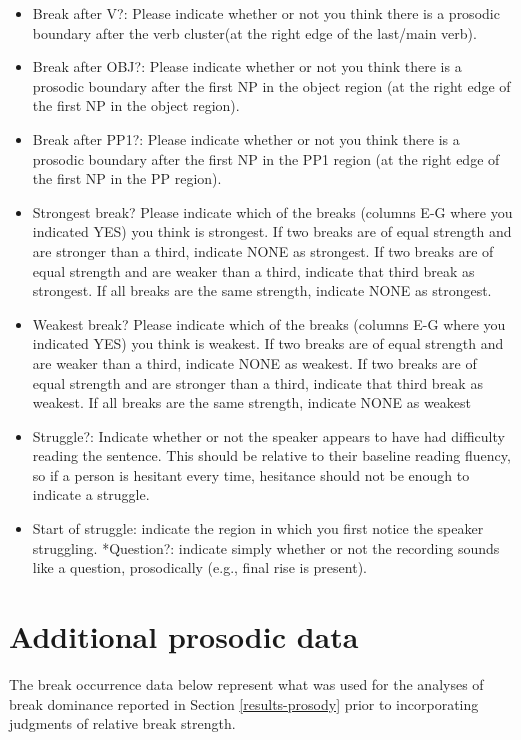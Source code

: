 \documentclass[11pt,oneside]{book}
\providecommand{\tightlist}{%
  \setlength{\itemsep}{0pt}\setlength{\parskip}{0pt}}
\begin{document}
\begin{itemize}
\tightlist
\item
  Break after V?: Please indicate whether or not you think there is a prosodic boundary after the verb cluster(at the right edge of the last/main verb).
\item
  Break after OBJ?: Please indicate whether or not you think there is a prosodic boundary after the first NP in the object region (at the right edge of the first NP in the object region).
\item
  Break after PP1?: Please indicate whether or not you think there is a prosodic boundary after the first NP in the PP1 region (at the right edge of the first NP in the PP region).
\item
  Strongest break? Please indicate which of the breaks (columns E-G where you indicated YES) you think is strongest. If two breaks are of equal strength and are stronger than a third, indicate NONE as strongest. If two breaks are of equal strength and are weaker than a third, indicate that third break as strongest. If all breaks are the same strength, indicate NONE as strongest.
\item
  Weakest break? Please indicate which of the breaks (columns E-G where you indicated YES) you think is weakest. If two breaks are of equal strength and are weaker than a third, indicate NONE as weakest. If two breaks are of equal strength and are stronger than a third, indicate that third break as weakest. If all breaks are the same strength, indicate NONE as weakest
\item
  Struggle?: Indicate whether or not the speaker appears to have had difficulty reading the sentence. This should be relative to their baseline reading fluency, so if a person is hesitant every time, hesitance should not be enough to indicate a struggle.
\item
  Start of struggle: indicate the region in which you first notice the speaker struggling.
  *Question?: indicate simply whether or not the recording sounds like a question, prosodically (e.g., final rise is present).
\end{itemize}

\clearpage

\hypertarget{proApp}{%
\chapter{Additional prosodic data}\label{proApp}}

The break occurrence data below represent what was used for the analyses of break dominance reported in Section \ref{results-prosody} prior to incorporating judgments of relative break strength.
\end{document}
